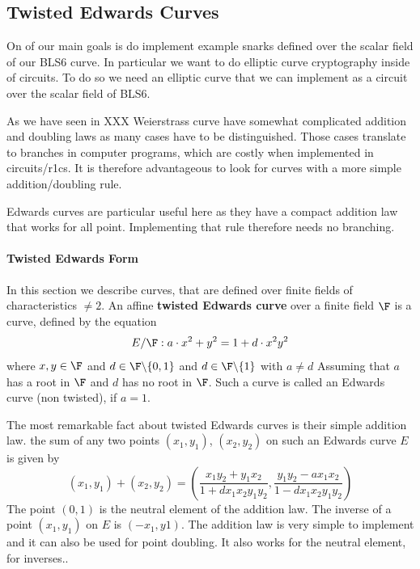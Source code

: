 
\subsection{Twisted Edwards Curves}
On of our main goals is do implement example snarks defined over the scalar field of our BLS6 curve. In particular we want to do elliptic curve cryptography inside of circuits. To do so we need an elliptic curve that we can implement as a circuit over the scalar field of BLS6. 

As we have seen in XXX Weierstrass curve have somewhat complicated addition and doubling laws as many cases have to be distinguished. Those cases translate to branches in computer programs, which are costly when implemented in circuits/r1cs. It is therefore advantageous to look for curves with a more simple addition/doubling rule.

Edwards curves are particular useful here as they have a compact addition law that works for all point. Implementing that rule therefore needs no branching. 
\paragraph{Twisted Edwards Form}
In this section we describe curves, that are defined over finite fields of characteristics $\neq 2$. An affine \textbf{twisted Edwards curve} over a finite field $\F$ is a curve, defined by the equation
$$E/\F:a\cdot x^2+y^2= 1+d\cdot x^2y^2$$ 
where $x,y\in \F$ and $d\in \F\backslash\{0,1\}$ and $d\in \F\backslash\{1\}$ with $a\neq d$ Assuming that $a$ has a root in $\F$ and $d$ has no root in $\F$. Such a curve is called an Edwards curve (non twisted), if $a=1$.

The most remarkable fact about twisted Edwards curves is their simple addition law.  the sum of any two points $(x_1, y_1)$, $(x_2, y_2)$ on such an Edwards curve $E$ is given by
$$
(x_1, y_1) + (x_2, y_2) =\left(\frac{x_1y_2+y_1x_2}{1 +dx_1x_2y_1y_2},\frac{y_1y_2-ax_1x_2}{1-dx_1x_2y_1y_2}\right)
$$
The point $(0,1)$ is the neutral element of the addition law. The inverse of a point $(x_1, y_1)$ on $E$ is $(-x_1, y1)$. The addition law is very simple to implement and it can also be used for point doubling. It also works for the neutral element, for inverses..

